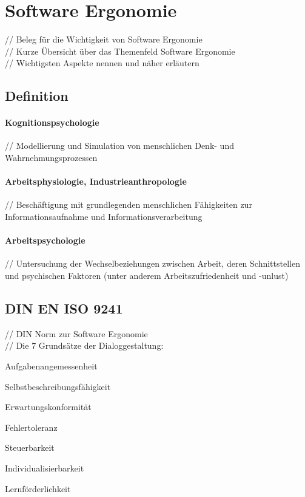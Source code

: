\documentclass[12pt,a4paper,bibliography=totocnumbered,listof=totocnumbered]{scrartcl}
\begin{document}
\section{Software Ergonomie}
// Beleg für die Wichtigkeit von Software Ergonomie\\
// Kurze Übersicht über das Themenfeld Software Ergonomie\\
// Wichtigsten Aspekte nennen und näher erläutern\\

\subsection{Definition}
\paragraph{Kognitionspsychologie}
// Modellierung und Simulation von menschlichen Denk- und Wahrnehmungsprozessen\\

\paragraph{Arbeitsphysiologie, Industrieanthropologie}
// Beschäftigung mit grundlegenden menschlichen Fähigkeiten zur Informationsaufnahme und Informationsverarbeitung\\

\paragraph{Arbeitspsychologie}
// Untersuchung der Wechselbeziehungen zwischen Arbeit, deren Schnittstellen und psychischen Faktoren (unter anderem Arbeitszufriedenheit und -unlust)\\

\subsection{DIN EN ISO 9241}
// DIN Norm zur Software Ergonomie\\
// Die 7 Grundsätze der Dialoggestaltung:
\begin{compactitem}
	\item Aufgabenangemessenheit
	\item Selbstbeschreibungsfähigkeit
	\item Erwartungskonformität
	\item Fehlertoleranz
	\item Steuerbarkeit
	\item Individualisierbarkeit
	\item Lernförderlichkeit
\end{compactitem}
\end{document}
